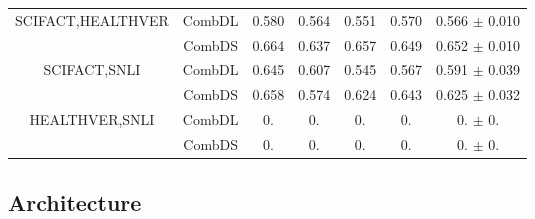 \begin{table}[h]
\begin{tabular}{|c|c||cccc|c|}
    \multirow{2}{*}{SCIFACT,HEALTHVER} & CombDL                    & \multicolumn{1}{c|}{0.580} & \multicolumn{1}{c|}{0.564} & \multicolumn{1}{c|}{0.551} & 0.570 & 0.566 $\pm$ 0.010               \\ \cline{2-7} 
                                       & CombDS                    & \multicolumn{1}{c|}{0.664} & \multicolumn{1}{c|}{0.637} & \multicolumn{1}{c|}{0.657} & 0.649 & 0.652 $\pm$ 0.010               \\ \hline 
    \multirow{2}{*}{SCIFACT,SNLI}      & CombDL                    & \multicolumn{1}{c|}{0.645} & \multicolumn{1}{c|}{0.607} & \multicolumn{1}{c|}{0.545} & 0.567 & 0.591 $\pm$ 0.039               \\ \cline{2-7} 
                                       & CombDS                    & \multicolumn{1}{c|}{0.658} & \multicolumn{1}{c|}{0.574} & \multicolumn{1}{c|}{0.624} & 0.643 & 0.625 $\pm$ 0.032               \\ \hline 
    \multirow{2}{*}{HEALTHVER,SNLI}    & CombDL                    & \multicolumn{1}{c|}{0.} & \multicolumn{1}{c|}{0.} & \multicolumn{1}{c|}{0.} & 0. & 0. $\pm$ 0.              \\ \cline{2-7} 
                                       & CombDS                    & \multicolumn{1}{c|}{0.} & \multicolumn{1}{c|}{0.} & \multicolumn{1}{c|}{0.} & 0. & 0. $\pm$ 0.     \\ \hline 
    
    \end{tabular}
\end{table}










\newpage
\subsection{Architecture}

